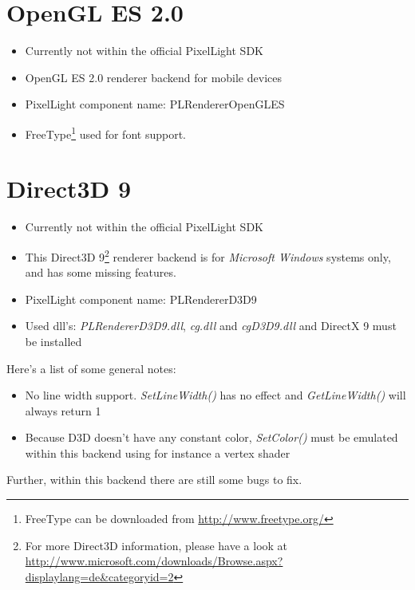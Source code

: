 \section{OpenGL ES 2.0}
\begin{itemize}
\item Currently not within the official PixelLight SDK
\item OpenGL ES 2.0 renderer backend for mobile devices
\item PixelLight component name: PLRendererOpenGLES
\item FreeType\footnote{FreeType can be downloaded from \url{http://www.freetype.org/}} used for font support.
\end{itemize}




\section{Direct3D 9}
\begin{itemize}
\item Currently not within the official PixelLight SDK
\item This Direct3D 9\footnote{For more Direct3D information, please have a look at \url{http://www.microsoft.com/downloads/Browse.aspx?displaylang=de&categoryid=2}} renderer backend is for \emph{Microsoft Windows} systems only, and has some missing features.
\item PixelLight component name: PLRendererD3D9
\item Used dll's: \emph{PLRendererD3D9.dll}, \emph{cg.dll} and \emph{cgD3D9.dll} and DirectX 9 must be installed
\end{itemize}

Here's a list of some general notes:
\begin{itemize}
\item No line width support. \emph{SetLineWidth()} has no effect and \emph{GetLineWidth()} will always return 1
\item Because D3D doesn't have any constant color, \emph{SetColor()} must be emulated within this backend using for instance a vertex shader
\end{itemize}
Further, within this backend there are still some bugs to fix.
